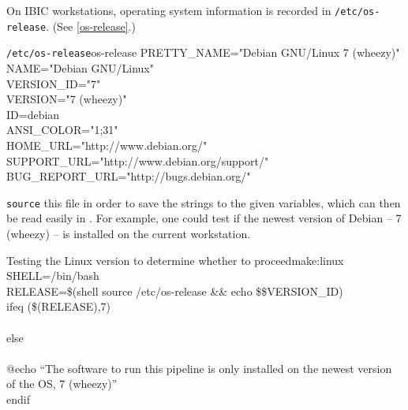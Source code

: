 On IBIC workstations, operating system information is recorded in \texttt{/etc/os-release}. (See \autoref{os-release}.)

\begin{bash}{\texttt{/etc/os-release}}{os-release}
	PRETTY_NAME="Debian GNU/Linux 7 (wheezy)" \\
	NAME="Debian GNU/Linux" \\
	VERSION_ID="7" \\ 
	VERSION="7 (wheezy)" \\
	ID=debian \\ 
	ANSI_COLOR="1;31" \\
	HOME_URL="http://www.debian.org/" \\
	SUPPORT_URL="http://www.debian.org/support/" \\
	BUG_REPORT_URL="http://bugs.debian.org/" 
\end{bash}

\texttt{source} this file in order to save the strings to the given variables, which can then be read easily in \maken{}. For example, one could test if the newest version of Debian -- 7 (wheezy) -- is installed on the current workstation.

\begin{make}{Testing the Linux version to determine whether to proceed}{make:linux}
SHELL=/bin/bash \\
RELEASE=\$(shell source /etc/os-release \&\& echo \$\$VERSION_ID)\\

ifeq (\$(RELEASE),7)\\
\\
else\\
 \\
\tab @echo ``The software to run this pipeline is only installed on the newest version of the OS, 7 (wheezy)'' \\
endif
\end{make}
